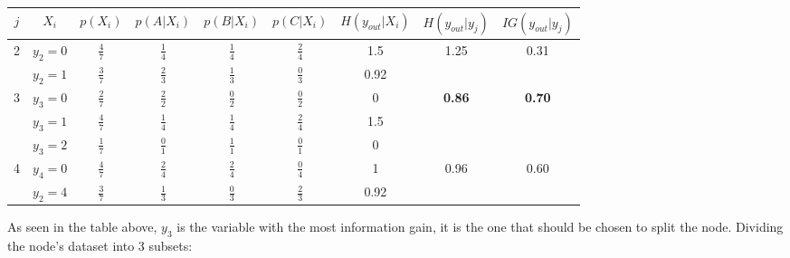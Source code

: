 \documentclass{article}
\begin{document}
\begin{enumerate}[leftmargin=\labelsep]
\begin{table}[H]
  \begin{tabular}{cc|ccccc|cc}
  $j$ & $X_i$                    & $p(X_i)$        & $p(A | X_i)$   & $p(B | X_i)$   & $p(C | X_i)$   & $H(y_{out}|X_i)$ & $H(y_{out}|y_j)$ & $IG(y_{out}|y_j)$ \\ \midrule
  \multirow{2}{*}{2} & $y_2=0$ & $\frac{4}{7}$ & $\frac{1}{4}$ & $\frac{1}{4}$ & $\frac{2}{4}$ & 1.5  & \multirow{2}{*}{1.25} & \multirow{2}{*}{0.31} \\
   &                   $y_2=1$ & $\frac{3}{7}$ & $\frac{2}{3}$ & $\frac{1}{3}$ & $\frac{0}{3}$ & 0.92 &  &  \\ \midrule
  \multirow{3}{*}{3} & $y_3=0$ & $\frac{2}{7}$ & $\frac{2}{2}$ & $\frac{0}{2}$ & $\frac{0}{2}$ & 0    & \multirow{3}{*}{\textbf{0.86}} & \multirow{3}{*}{\textbf{0.70}} \\
   &                   $y_3=1$ & $\frac{4}{7}$ & $\frac{1}{4}$ & $\frac{1}{4}$ & $\frac{2}{4}$ & 1.5  &  &  \\
   &                   $y_3=2$ & $\frac{1}{7}$ & $\frac{0}{1}$ & $\frac{1}{1}$ & $\frac{0}{1}$ & 0    &  &  \\ \midrule
  \multirow{2}{*}{4} & $y_4=0$ & $\frac{4}{7}$ & $\frac{2}{4}$ & $\frac{2}{4}$ & $\frac{0}{4}$ & 1    & \multirow{2}{*}{0.96} & \multirow{2}{*}{0.60} \\
   &                   $y_2=4$ & $\frac{3}{7}$ & $\frac{1}{3}$ & $\frac{0}{3}$ & $\frac{2}{3}$ & 0.92 &  &  \\ \bottomrule
  \end{tabular}
\end{table}

As seen in the table above, $y_3$ is the variable with the 
most information gain, it is the one that should be chosen 
to split the node.
Dividing the node's dataset into 3 subsets:

\vspace{-3pt}


\end{enumerate}
\end{document}
